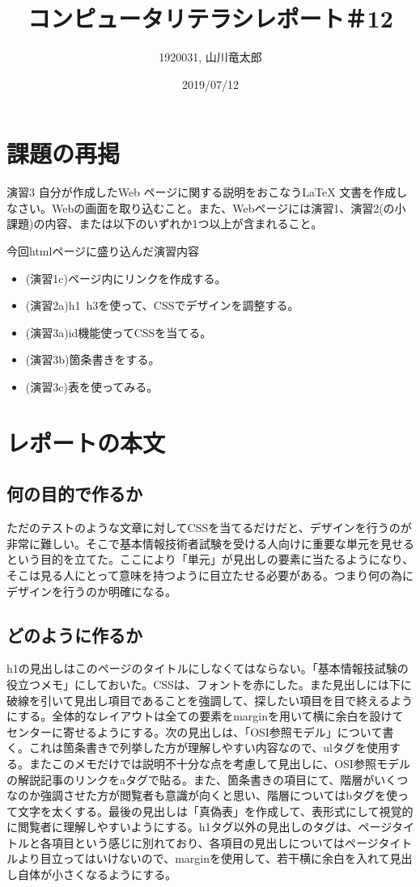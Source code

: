 \documentclass[12pt,a4j]{jarticle}
\begin{document}
\title{コンピュータリテラシレポート＃12}
\author{1920031, 山川竜太郎}
\date{2019/07/12}
\maketitle


\section{課題の再掲}
演習3 自分が作成したWeb ページに関する説明をおこなうLaTeX 文書を作成しなさい。Webの画面を取り込むこと。また、Webページには演習1、演習2(の小課題)の内容、または以下のいずれか1つ以上が含まれること。

今回htmlページに盛り込んだ演習内容

\begin{itemize}
  \item (演習1c)ページ内にリンクを作成する。
  \item (演習2a)h1~h3を使って、CSSでデザインを調整する。
  \item (演習3a)id機能使ってCSSを当てる。
  \item (演習3b)箇条書きをする。
  \item (演習3c)表を使ってみる。
\end{itemize}

\section{レポートの本文}

\subsection{何の目的で作るか}

ただのテストのような文章に対してCSSを当てるだけだと、デザインを行うのが非常に難しい。そこで基本情報技術者試験を受ける人向けに重要な単元を見せるという目的を立てた。ここにより「単元」が見出しの要素に当たるようになり、そこは見る人にとって意味を持つように目立たせる必要がある。つまり何の為にデザインを行うのか明確になる。

\subsection{どのように作るか}

h1の見出しはこのページのタイトルにしなくてはならない。「基本情報技試験の役立つメモ」にしておいた。CSSは、フォントを赤にした。また見出しには下に破線を引いて見出し項目であることを強調して、探したい項目を目で終えるようにする。全体的なレイアウトは全ての要素をmarginを用いて横に余白を設けてセンターに寄せるようにする。次の見出しは、「OSI参照モデル」について書く。これは箇条書きで列挙した方が理解しやすい内容なので、ulタグを使用する。またこのメモだけでは説明不十分な点を考慮して見出しに、OSI参照モデルの解説記事のリンクをaタグで貼る。また、箇条書きの項目にて、階層がいくつなのか強調させた方が閲覧者も意識が向くと思い、階層についてはbタグを使って文字を太くする。最後の見出しは「真偽表」を作成して、表形式にして視覚的に閲覧者に理解しやすいようにする。h1タグ以外の見出しのタグは、ページタイトルと各項目という感じに別れており、各項目の見出しについてはページタイトルより目立ってはいけないので、marginを使用して、若干横に余白を入れて見出し自体が小さくなるようにする。
\end{document}
